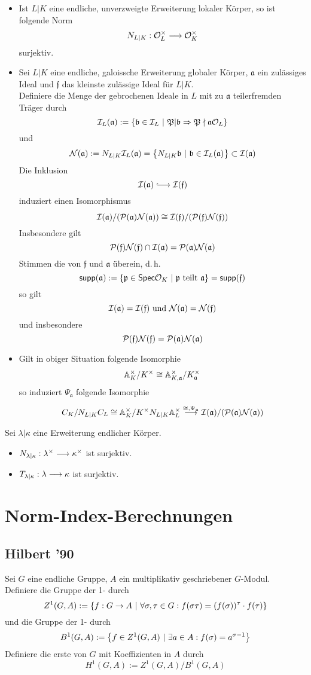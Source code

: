 \documentclass{book}
\renewcommand{\A}{\mathbb{A}}
\newcommand{\Nc}{\mathcal{N}}
\newcommand{\af}{\mathfrak{a}}
\renewcommand{\bf}{\mathfrak{b}}
\newcommand{\ff}{\mathfrak{f}}
\newcommand{\pf}{\mathfrak{p}}
\newcommand{\Pf}{\mathfrak{P}}
\begin{document}
\Satz{}
\begin{itemize}
\item Ist $L|K$ eine endliche, unverzweigte Erweiterung lokaler Körper, so ist folgende Norm
\[ N_{L|K} : \mathcal{O}_L^\times \overset{}{\longrightarrow} \mathcal{O}_K^\times \]
surjektiv.
\item Sei $L|K$ eine endliche, galoissche Erweiterung globaler Körper, $\af$ ein zulässiges Ideal und $\ff$ das kleinste zulässige Ideal für $L|K$.\\
Definiere die Menge der gebrochenen Ideale in $L$ mit zu $\af$ teilerfremden Träger durch
\[ \I_L(\af) := \set{\bf \in \I_L}{ \Pf | \bf \impl{} \Pf \nmid \af\O_L } \]
und
\[ \Nc(\af) := N_{L|K}\I_L(\af) = \set{N_{L|K}\bf}{\bf \in \I_L(\af)} \subset \I(\af) \]
Die Inklusion
\[ \I(\af) \Inj{} \I(\ff) \]
induziert einen Isomorphismus
\[ \I(\af) / (\P(\af) \Nc(\af)) \isom{} \I(\ff) / (\P(\ff) \Nc(\ff)) \]
Insbesondere gilt
\[ \P(\ff) \Nc(\ff) \cap \I(\af) = \P(\af)\Nc(\af) \]
Stimmen die  von $\ff$ und $\af$ überein, d.\,h.
\[ \textsf{supp}(\af) := \set{\pf \in \textsf{Spec}\O_K }{ \pf \text{ teilt } \af } = \textsf{supp}(\ff)  \]
so gilt
\[ \I(\af) = \I(\ff) \text{ und } \Nc(\af) = \Nc(\ff) \]
und insbesondere
\[ \P(\ff) \Nc(\ff) = \P(\af) \Nc(\af) \]
\item Gilt in obiger Situation folgende Isomorphie
\[ \A_K^\times/K^\times \isom{} \A_{K,\af}^\times/K_\af^\times \]
so induziert $\Psi_\af$ folgende Isomorphie
\[ C_K / N_{L|K}C_L \isom{} \A_K^\times / K^\times N_{L|K}\A_L^\times \Pfeil{\isom{}, \Psi_\af} \I(\af) / (\P(\af) \Nc (\af)) \]
\end{itemize}

\Lem{}
Sei $\lambda | \kappa$ eine Erweiterung endlicher Körper.
\begin{itemize}
\item $N_{\lambda|\kappa} : \lambda^\times \overset{}{\longrightarrow} \kappa^\times$ ist surjektiv.
\item $T_{\lambda|\kappa} : \lambda \overset{}{\longrightarrow} \kappa$ ist surjektiv.
\end{itemize}

\chapter{Norm-Index-Berechnungen}

\section{Hilbert '90}
Sei $G$ eine endliche Gruppe, $A$ ein multiplikativ geschriebener $G$-Modul.\\
Definiere die Gruppe der 1- durch
\[Z^1(G,A) := \{ f : G \overset{}{\rightarrow} A ~|~ \forall  \sigma, \tau \in G: f(\sigma \tau) = (f(\sigma))^\tau \cdot f(\tau) \} \]
und die Gruppe der 1- durch
\[ B^1(G,A) := \set{f \in Z^1(G,A)}{ \exists a \in A: f(\sigma) = a^{\sigma - 1} } \]
Definiere die erste  von $G$ mit Koeffizienten in $A$ durch
\[ H^1(G,A) := Z^1(G,A) / B^1(G,A) \]
\end{document}
